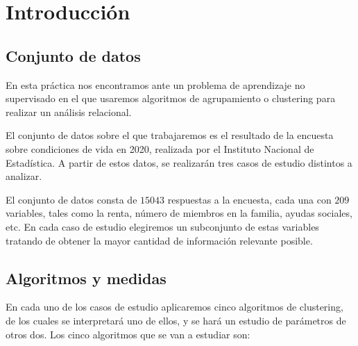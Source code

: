 
\chapter{Introducción}


\section{Conjunto de datos}
En esta práctica nos encontramos ante un problema de aprendizaje no supervisado en el que usaremos algoritmos de agrupamiento o clustering para realizar un análisis relacional.

El conjunto de datos sobre el que trabajaremos es el resultado de la encuesta sobre condiciones de vida en 2020, realizada por el Instituto Nacional de Estadística. A partir de estos datos, se realizarán tres casos de estudio distintos a analizar.

El conjunto de datos consta de $15043$ respuestas a la encuesta, cada una con $209$ variables, tales como la renta, número de miembros en la familia, ayudas sociales, etc. En cada caso de estudio elegiremos un subconjunto de estas variables tratando de obtener la mayor cantidad de información relevante posible.


\section{Algoritmos y medidas}
En cada uno de los casos de estudio aplicaremos cinco algoritmos de clustering, de los cuales se interpretará uno de ellos, y se hará un estudio de parámetros de otros dos. Los cinco algoritmos que se van a estudiar son:

